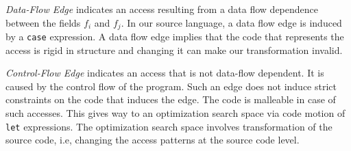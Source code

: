 \textit{Data-Flow Edge} indicates an access resulting from a data flow dependence between the fields $f_i$ and $f_j$. In our source language, a data flow edge is induced by
a \lstinline|case| expression.
A data flow edge implies that the code that represents the access is rigid in structure and changing it can make our transformation invalid.

\textit{Control-Flow Edge} indicates an access that is not data-flow dependent. It is caused by the control flow of the program. Such an edge does not induce strict constraints on the code that induces the edge. The code is malleable in case of such accesses. This gives way to an optimization search space via code motion of \lstinline|let| expressions. The optimization search space involves transformation of the source code, i.e, changing the access patterns at the source code level.
%





